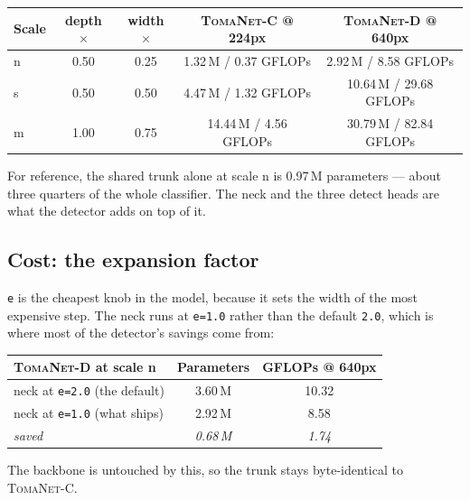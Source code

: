 \documentclass[11pt,a4paper]{article}
\newcommand{\modelcls}{\textsc{TomaNet-C}}
\newcommand{\modeldet}{\textsc{TomaNet-D}}
\begin{document}
\begin{center}
\small
\begin{tabular}{@{}lcccc@{}}
\toprule
\textbf{Scale} & \textbf{depth $\times$} & \textbf{width $\times$} & \textbf{\modelcls{} @ 224px} & \textbf{\modeldet{} @ 640px} \\
\midrule
n & 0.50 & 0.25 & 1.32\,M / 0.37 GFLOPs & 2.92\,M / 8.58 GFLOPs \\
s & 0.50 & 0.50 & 4.47\,M / 1.32 GFLOPs & 10.64\,M / 29.68 GFLOPs \\
m & 1.00 & 0.75 & 14.44\,M / 4.56 GFLOPs & 30.79\,M / 82.84 GFLOPs \\
\bottomrule
\end{tabular}
\end{center}

\vspace{4pt}
\noindent For reference, the shared trunk alone at scale n is 0.97\,M parameters --- about
three quarters of the whole classifier. The neck and the three detect heads are what the
detector adds on top of it.

\subsection*{Cost: the expansion factor}
\texttt{e} is the cheapest knob in the model, because it sets the width of the most
expensive step. The neck runs at \texttt{e=1.0} rather than the default \texttt{2.0},
which is where most of the detector's savings come from:

\begin{center}
\small
\begin{tabular}{@{}lcc@{}}
\toprule
\textbf{\modeldet{} at scale n} & \textbf{Parameters} & \textbf{GFLOPs @ 640px} \\
\midrule
neck at \texttt{e=2.0} (the default)   & 3.60\,M & 10.32 \\
neck at \texttt{e=1.0} (what ships)    & 2.92\,M & 8.58 \\
\midrule
\textit{saved}                          & \textit{0.68\,M} & \textit{1.74} \\
\bottomrule
\end{tabular}
\end{center}

\noindent The backbone is untouched by this, so the trunk stays byte-identical to
\modelcls{}.
\end{document}
